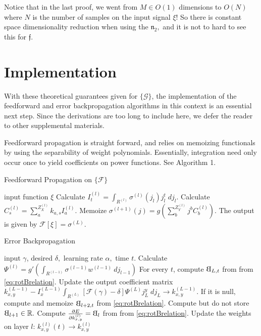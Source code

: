 \documentclass{article}
\newcommand{\rotB}{\scalebox{-1}[1]{B}}
\begin{document}
    Notice that in the last proof, we went from $M \in O(1)$ dimensions to $O(N)$ 
    where $N$ is the number of samples on the input signal $\xi$! So there is constant space dimensionality
    reduction when using the $\mathfrak{n}_2,$ and it is not to hard to see this for $\mathfrak{f}.$

    \section{Implementation}
    With these theoretical guarantees given for $\{\mathcal{G}\}$, the implementation of the feedforward and error backpropagation algorithms in this context is an essential next step. Since the derivations are too long to include here, we defer the reader to other supplemental materials.

    Feedforward propagation is straight forward, and relies on memoizing functionals
    by using the separability of weight polynomials. Essentially, integration need only
    occur once to yield coefficients on power functions. See Algorithm 1.




\begin{algorithm}[tb]
   \caption{Feedforward Propagation on $\{\mathcal{F}\}$}
   \label{alg:example}
\begin{algorithmic}
    input function $\xi$
   \STATE Calculate $I^{(l)}_t = \int_{R^{(l)}} \sigma^{(l)}(j_l)j_l^{t}\;dj_l.$
   \ENDFOR
   \STATE Calculate $C^{(l)}_{s} = \sum_{a}^{Z^{(l)}_X} k_{a,s} I^{(l)}_{a}.$
   \ENDFOR
   \STATE Memoize $\sigma^{(l+1)}(j)=g\left(\sum_{b}^{Z^{(l)}_Y} j^{b} C^{(l)}_{b}\right).$
   \ENDFOR
   \STATE The output is given by $\mathcal{F}[\xi] = \sigma^{(L)}$.
\end{algorithmic}
\end{algorithm}

\begin{algorithm}[tb]
   \caption{Error Backpropagation}
   \label{alg:example}
\begin{algorithmic}
    input $\gamma$, desired $\delta,$ learning rate $\alpha,$ time $t.$
    \STATE Calculate $\Psi^{(l)}=g'\left(\int_{R^{(l-1)}}{\sigma^{(l-1)} w^{(l-1)}\ dj_{l-1}}\right)$
   \ENDFOR
   \STATE For every $t$, compute  $\rotB_{L,t}$ from from \eqref{eq:rotBrelation}.
   \STATE Update the output coefficient matrix
          $k_{x,y}^{(L-1)} - I_x^{(L-1)}
                  \int_{R^{(L)}} \left[\mathcal{F}(\gamma) - \delta\right] 
                    \Psi^{(L)} j_L^y \; dj_L \to  k_{x,y}^{(L-1)}.$
    \STATE If it is null, compute and memoize $ \rotB_{l+2,t}$ from \eqref{eq:rotBrelation}.
    \STATE Compute but do not store $\rotB_{l+1} \in \mathbb{R}.$
    \STATE Compute $\frac{\partial E}{\partial k_{x,y}^{(l)}} = \rotB_l$ from from \eqref{eq:rotBrelation}.
    \STATE Update the weights on layer $l$: $k_{x,y}^{(l)}(t) \to k_{x,y}^{(l)} $
    \ENDFOR
\end{algorithmic}
\end{algorithm}
\end{document}
